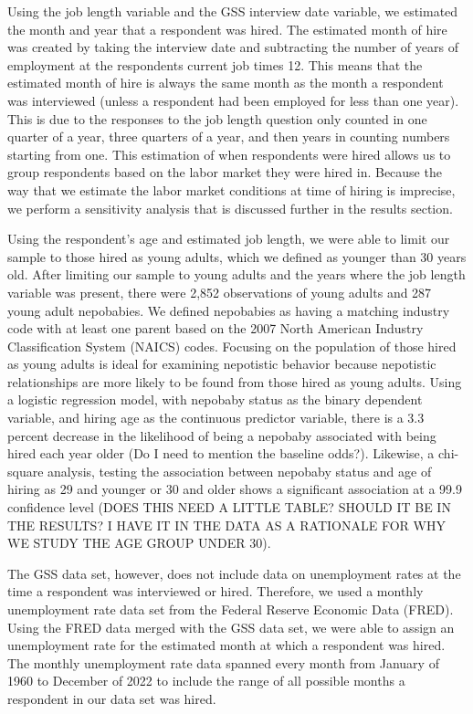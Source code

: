 \documentclass[12pt]{article}
\begin{document}
Using the job length variable and the GSS interview date variable, we estimated the month and year that a respondent was hired. The estimated month of hire was created by taking the interview date and subtracting the number of years of employment at the respondents current job times 12. This means that the estimated month of hire is always the same month as the month a respondent was interviewed (unless a respondent had been employed for less than one year). This is due to the responses to the job length question only counted in one quarter of a year, three quarters of a year, and then years in counting numbers starting from one. This estimation of when respondents were hired allows us to group respondents based on the labor market they were hired in. Because the way that we estimate the labor market conditions at time of hiring is imprecise, we perform a sensitivity analysis that is discussed further in the results section.

Using the respondent’s age and estimated job length, we were able to limit our sample to those hired as young adults, which we defined as younger than 30 years old. After limiting our sample to young adults and the years where the job length variable was present, there were 2,852  observations of young adults and 287 young adult nepobabies. We defined nepobabies as having a matching industry code with at least one parent based on the 2007 North American Industry Classification System (NAICS) codes. Focusing on the population of those hired as young adults is ideal for examining nepotistic behavior because nepotistic relationships are more likely to be found from those hired as young adults. Using a logistic regression model, with nepobaby status as the binary dependent variable, and hiring age as the continuous predictor variable, there is a 3.3 percent decrease in the likelihood of being a nepobaby associated with being hired each year older (Do I need to mention the baseline odds?). Likewise, a chi-square analysis, testing the association between nepobaby status and age of hiring as 29 and younger or 30 and older shows a significant association at a 99.9 confidence level (DOES THIS NEED A LITTLE TABLE? SHOULD IT BE IN THE RESULTS? I HAVE IT IN THE DATA AS A RATIONALE FOR WHY WE STUDY THE AGE GROUP UNDER 30).

The GSS data set, however, does not include data on unemployment rates at the time a respondent was interviewed or hired. Therefore, we used a monthly unemployment rate data set from the Federal Reserve Economic Data (FRED). Using the FRED data merged with the GSS data set, we were able to assign an unemployment rate for the estimated month at which a respondent was hired. The monthly unemployment rate data spanned every month from January of 1960 to December of 2022 to include the range of all possible months a respondent in our data set was hired. 
\end{document}
